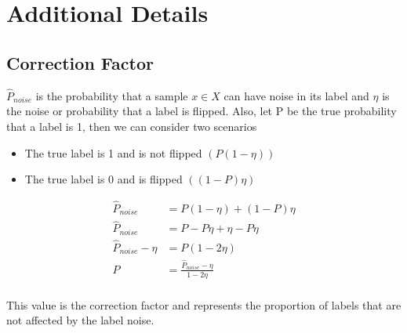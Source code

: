 \appendix

\section{Additional Details}
\subsection{Correction Factor}
\label{correction_factor}
$\hat{P}_{noise}$ is the probability that a sample $x \in X$ can have noise in its label and $\eta$ is the noise or probability that a label is flipped. Also, let P be the true probability that a label is 1, then we can consider two scenarios
\begin{itemize}
    \item The true label is 1 and is not flipped $\left(P(1-\eta)\right)$
    \item The true label is 0 and is flipped $\left((1-P)\eta\right)$
\end{itemize}
\begin{align*}
    \hat{P}_{noise} &= P(1-\eta) + (1-P)\eta \\
    \hat{P}_{noise} &= P - P\eta + \eta - P\eta \\
    \hat{P}_{noise} - \eta &= P(1 - 2\eta) \\
    P &= \frac{\hat{P}_{noise} - \eta}{1 - 2\eta} \\
\end{align*}

This value is the correction factor and represents the proportion of labels that are not affected by the label noise.

